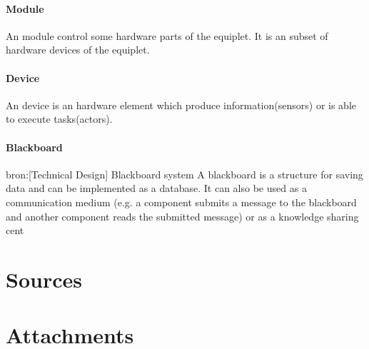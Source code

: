 \documentclass[12pt,a4paper]{report}
\begin{document}
\subsubsection{Module}
An module control some hardware parts of the equiplet. It is an subset of hardware devices of the equiplet.
\subsubsection{Device}
An device is an hardware element which produce information(sensors) or is able to execute tasks(actors).
\subsubsection{Blackboard}
bron:[Technical Design] Blackboard system
A blackboard is a structure for saving data and can be implemented as a database. It can also be used as a communication medium (e.g. a component submits a message to the blackboard and another component reads the submitted message) or as a knowledge sharing cent

\chapter{Sources}

\chapter{Attachments}



\end{document}
